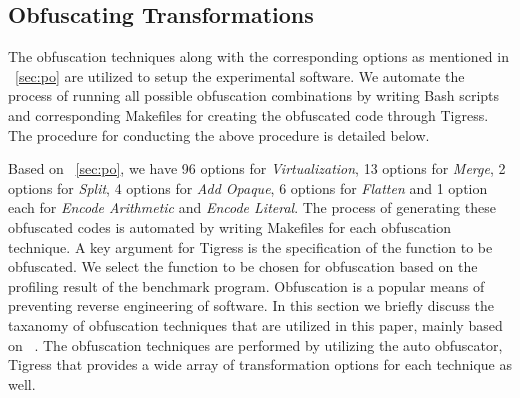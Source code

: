 \subsection{Obfuscating Transformations}

The obfuscation techniques along with the corresponding options as mentioned in ~\ref{sec:po} are utilized to setup the experimental software. We automate the process of running all possible obfuscation combinations by writing Bash scripts and corresponding Makefiles for creating the obfuscated code through Tigress. The procedure for conducting the above procedure is detailed below.

Based on ~\ref{sec:po}, we have 96 options for \emph{Virtualization}, 13 options for \emph{Merge}, 2 options for \emph{Split}, 4 options for \emph{Add Opaque}, 6 options for \emph{Flatten} and 1 option each for \emph{Encode Arithmetic} and \emph{Encode Literal}. The process of generating these obfuscated codes is automated by writing Makefiles for each obfuscation technique. A key argument for Tigress is the specification of the function to be obfuscated. We select the function to be chosen for obfuscation based on the profiling result of the benchmark program. 
Obfuscation is a popular means of preventing reverse engineering of software. In this section we briefly discuss the taxanomy of obfuscation techniques that are utilized in this paper, mainly based on ~\cite{collberg1997taxonomy}. The obfuscation techniques are performed by utilizing the auto obfuscator, Tigress that provides a wide array of transformation options for each technique as well.


